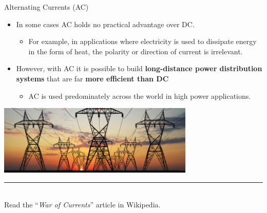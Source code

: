 \begin{frame}{Alternating Currents (AC)}

\begin{itemize}
  \item In some cases AC holds no practical advantage over DC.
     \begin{itemize}
        \item For example, in applications where electricity is used
                  to dissipate energy in the form of heat, the polarity or direction of current is irrelevant.
     \end{itemize}
  \vspace{0.3cm}
  \item However, with AC it is possible to build {\bf long-distance power
            distribution systems} that are far {\bf more efficient than DC}
     \begin{itemize}
         \item AC is used predominately across the world in high power applications.
     \end{itemize}
\end{itemize}

\begin{center}
    \includegraphics[width=0.70\textwidth]{./images/photos/power_distribution_01.jpg}\\
\end{center}

\noindent\rule{2cm}{0.4pt}\\
{\small
   Read the ``{\em War of Currents}'' article in Wikipedia.
}

\end{frame}


%
%
%

